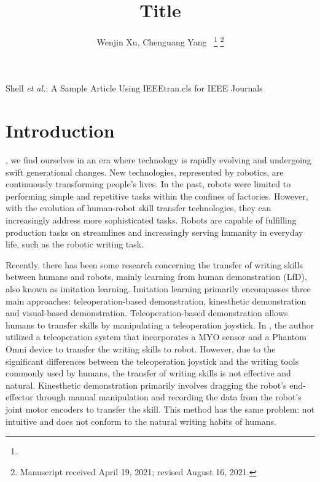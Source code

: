 \documentclass[journal]{IEEEtran}
\begin{document}
\title{Title}
\author{Wenjin Xu, Chenguang Yang~
    \thanks{}
    \thanks{Manuscript received April 19, 2021; revised August 16, 2021.}}

%
{Shell \MakeLowercase{\textit{et al.}}: A Sample Article Using IEEEtran.cls for IEEE Journals}


\maketitle
\begin{abstract}
    
\end{abstract}

\begin{IEEEkeywords}

\end{IEEEkeywords}

\section{Introduction}
, we find ourselves in an era where technology is rapidly evolving and undergoing swift generational changes. New technologies, represented by robotics, are continuously transforming people's lives. In the past, robots were limited to performing simple and repetitive tasks within the confines of factories. However, with the evolution of human-robot skill transfer technologies, they can increasingly address more sophisticated tasks. Robots are capable of fulfilling production tasks on streamlines and increasingly serving humanity in everyday life, such as the robotic writing task.

Recently, there has been some research concerning the transfer of writing skills between humans and robots, mainly learning from human demonstration (LfD), also known as imitation learning. Imitation learning primarily encompasses three main approaches: teleoperation-based demonstration, kinesthetic demonstration and visual-based demonstration. Teleoperation-based demonstration  allows humans to transfer skills by manipulating a teleoperation joystick. In \cite{Yang2015}, the author utilized a teleoperation system that incorporates a MYO sensor and a Phantom Omni device to transfer the writing skills to robot. However, due to the significant differences between the teleoperation joystick and the writing tools commonly used by humans, the transfer of writing skills is not effective and natural. Kinesthetic demonstration primarily involves dragging the robot's end-effector through manual manipulation and recording the data from the robot's joint motor encoders to transfer the skill. This method has the same problem: not intuitive and does not conform to the natural writing habits of humans. 
\end{document}
